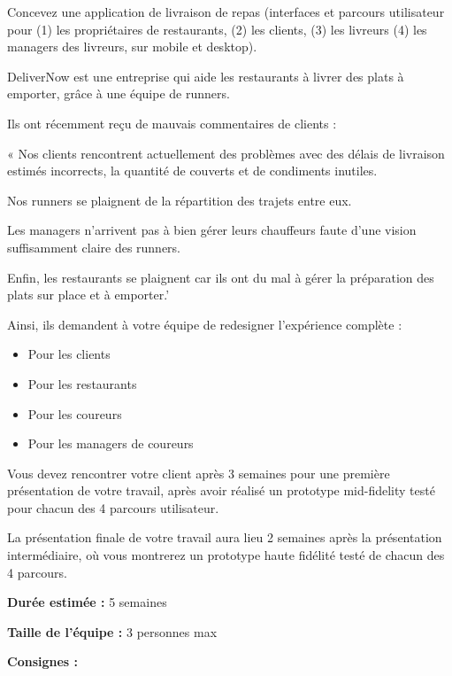 \makeheaderfiles

Concevez une application de livraison de repas (interfaces et parcours utilisateur pour (1) les propriétaires de restaurants, (2) les clients, (3) les livreurs (4) les managers des livreurs, sur mobile et desktop).

DeliverNow est une entreprise qui aide les restaurants à livrer des plats à emporter, grâce à une équipe de runners.

Ils ont récemment reçu de mauvais commentaires de clients :

« Nos clients rencontrent actuellement des problèmes avec des délais de livraison estimés incorrects, la quantité de couverts et de condiments inutiles.

Nos runners se plaignent de la répartition des trajets entre eux.

Les managers n'arrivent pas à bien gérer leurs chauffeurs faute d'une vision suffisamment claire des runners.

Enfin, les restaurants se plaignent car ils ont du mal à gérer la préparation des plats sur place et à emporter.'

Ainsi, ils demandent à votre équipe de redesigner l'expérience complète :

\begin{itemize}
\item Pour les clients
\item Pour les restaurants
\item Pour les coureurs
\item Pour les managers de coureurs
\end{itemize}

Vous devez rencontrer votre client après 3 semaines pour une première présentation de votre travail, après avoir réalisé un prototype mid-fidelity testé pour chacun des 4 parcours utilisateur.

La présentation finale de votre travail aura lieu 2 semaines après la présentation intermédiaire, où vous montrerez un prototype haute fidélité testé de chacun des 4 parcours.

\textbf{Durée estimée :} 5 semaines

\textbf{Taille de l'équipe :} 3 personnes max

\textbf{Consignes :}

